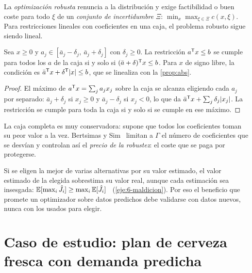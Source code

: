 La \emph{optimización robusta} renuncia a la distribución y exige factibilidad o buen coste para todo $\xi$ de un \emph{conjunto de incertidumbre} $\Xi$: $\min_x\max_{\xi\in\Xi}c(x,\xi)$. Para restricciones lineales con coeficientes en una caja, el problema robusto sigue siendo lineal.

\begin{proposicion}\label{prop:robusta}
Sea $x\ge 0$ y $a_j\in[\bar a_j-\delta_j,\ \bar a_j+\delta_j]$ con $\delta_j\ge 0$. La restricción $a^{\mathsf{T}} x\le b$ se cumple para todos los $a$ de la caja si y solo si $(\bar a+\delta)^{\mathsf{T}} x\le b$. Para $x$ de signo libre, la condición es $\bar a^{\mathsf{T}} x+\delta^{\mathsf{T}}\lvert x\rvert\le b$, que se linealiza con la \cref{prop:abs}.
\end{proposicion}

\begin{proof}
El máximo de $a^{\mathsf{T}} x=\sum_ja_jx_j$ sobre la caja se alcanza eligiendo cada $a_j$ por separado: $\bar a_j+\delta_j$ si $x_j\ge 0$ y $\bar a_j-\delta_j$ si $x_j<0$, lo que da $\bar a^{\mathsf{T}} x+\sum_j\delta_j\lvert x_j\rvert$. La restricción se cumple para toda la caja si y solo si se cumple en ese máximo.
\end{proof}

La caja completa es muy conservadora: supone que todos los coeficientes toman su peor valor a la vez. Bertsimas y Sim~\cite{bsim} limitan a $\Gamma$ el número de coeficientes que se desvían y controlan así el \emph{precio de la robustez}: el coste que se paga por protegerse.

\begin{observacion}\label{obs:maldicion}
Si se eligen la mejor de varias alternativas por su valor estimado, el valor estimado de la elegida sobrestima su valor real, aunque cada estimación sea insesgada: $\mathbb{E}[\max_i\hat J_i]\ge\max_i\mathbb{E}[\hat J_i]$~\cite{smith} (\cref{eje:6-maldicion}). Por eso el beneficio que promete un optimizador sobre datos predichos debe validarse con datos nuevos, nunca con los usados para elegir.
\end{observacion}

\section{Caso de estudio: plan de cerveza fresca con demanda predicha}

